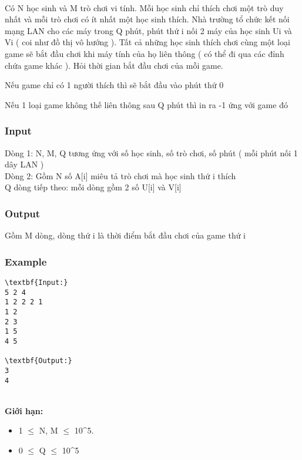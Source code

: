 

 

Có N học sinh và M trò chơi vi tính. Mỗi học sinh chỉ thích chơi một trò duy nhất và mỗi trò chơi có ít nhất một học sinh thích. Nhà trường tổ chức kết nối mạng LAN cho các máy trong Q phút, phút thứ i nối 2 máy của học sinh Ui và Vi ( coi như đồ thị vô hướng ). Tất cả những học sinh thích chơi cùng một loại game sẽ bắt đầu chơi khi máy tính của họ liên thông ( có thể đi qua các đỉnh chứa game khác ). Hỏi thời gian bắt đầu chơi của mỗi game.

Nếu game chỉ có 1 người thích thì sẽ bắt đầu vào phút thứ 0

Nếu 1 loại game không thế liên thông sau Q phút thì in ra -1 ứng với game đó

\subsubsection{Input}

Dòng 1: N, M, Q tương ứng với số học sinh, số trò chơi, số phút ( mỗi phút nối 1 dây LAN )
\\Dòng 2: Gồm N số A[i] miêu tả trò chơi mà học sinh thứ i thích
\\Q dòng tiếp theo: mỗi dòng gồm 2 số U[i] và V[i]

\subsubsection{Output}

Gồm M dòng, dòng thứ i là thời điểm bắt đầu chơi của game thứ i

\subsubsection{Example}
\begin{verbatim}
\textbf{Input:}
5 2 4
1 2 2 2 1
1 2
2 3
1 5
4 5

\textbf{Output:}
3
4\end{verbatim}
\\\textbf{Giới hạn:} 
\begin{itemize}
	\item 1  $\le$  N, M  $\le$  10\textasciicircum5.
	\item 0  $\le$  Q  $\le$  10\textasciicircum5
\end{itemize}
